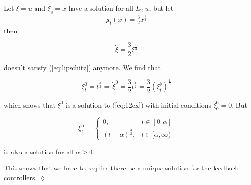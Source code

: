 \begin{example}
Let $\dot{\xi}=u$ and $\xi_s=x$ have a solution for all $L_2$ $u$, but let
\begin{align}
\label{eq:12ex}
\mu_t(x)=\frac{3}{2}x^{\frac{1}{3}}
\end{align}
then

\begin{equation*}
\dot{\xi}=\frac{3}{2}\xi^{\frac{1}{3}}
\end{equation*}

doesn't satisfy (\ref{eq:lipschitz}) anymore.
We find that

\begin{equation*}
\xi_t^0=t^{\frac{3}{2}} \Rightarrow \dot{\xi}^0=\frac{3}{2}t^{\frac{1}{2}} = \frac{3}{2}{(\xi_t^0)}^{\frac{1}{3}}
\end{equation*}

which shows that $\xi^0$ is a solution to (\ref{eq:12ex}) with initial conditions $\xi_0^0=0$.
But

\begin{equation*}
\xi_t^\alpha = \begin{cases} 0, & t\in[0,\alpha] \\ {(t-\alpha)}^{\frac{3}{2}}, & t\in[\alpha,\infty) \end{cases}%
\end{equation*}

is also a solution for all $\alpha\geq0$.

This shows that we have to require there be a unique solution for the feedback controllers.
$\lozenge$
\end{example}%
